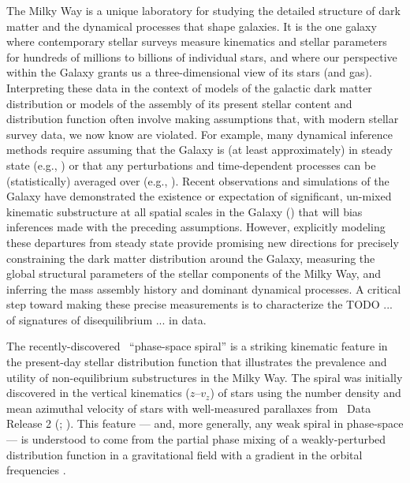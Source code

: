 The Milky Way is a unique laboratory for studying the detailed structure of dark matter and the dynamical processes that shape galaxies.
It is the one galaxy where contemporary stellar surveys measure kinematics and stellar parameters for hundreds of millions to billions of individual stars, and where our perspective within the Galaxy grants us a three-dimensional view of its stars (and gas).
Interpreting these data in the context of models of the galactic dark matter distribution or models of the assembly of its present stellar content and distribution function often involve making assumptions that, with modern stellar survey data, we now know are violated.
For example, many dynamical inference methods require assuming that the Galaxy is (at least approximately) in steady state (e.g., ) or that any perturbations and time-dependent processes can be (statistically) averaged over (e.g., ).
Recent observations and simulations of the Galaxy have demonstrated the existence or expectation of significant, un-mixed kinematic substructure at all spatial scales in the Galaxy () that will bias inferences made with the preceding assumptions.
However, explicitly modeling these departures from steady state provide promising new directions for precisely constraining the dark matter distribution around the Galaxy, measuring the global structural parameters of the stellar components of the Milky Way, and inferring the mass assembly history and dominant dynamical processes.
A critical step toward making these precise measurements is to characterize the TODO ... of signatures of disequilibrium ... in data.

The recently-discovered \gaia\ ``phase-space spiral'' is a striking kinematic feature in the present-day stellar distribution function that illustrates the prevalence and utility of non-equilibrium substructures in the Milky Way.
The spiral was initially discovered in the vertical kinematics ($z$--$v_z$) of stars using the number density and mean azimuthal velocity of stars with well-measured parallaxes from \gaia\ Data Release 2 (; \citealt{Antoja:2018}).
This feature --- and, more generally, any weak spiral in phase-space --- is understood to come from the partial phase mixing of a weakly-perturbed distribution function in a gravitational field with a gradient in the orbital frequencies \citep[e.g.,][]{Binney:2018}.


